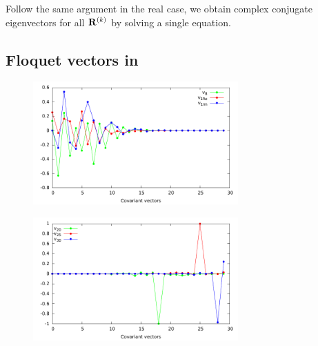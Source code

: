 \documentclass[mathserif, handout]{beamer}
\begin{document}
\begin{frame}[allowframebreaks]
\begin{itemize}
       Follow the same argument in the real case, we obtain complex conjugate
       eigenvectors for all $\mathbf{R}^{(k)}$ by solving a single equation.

  \end{itemize}

\end{frame}

\subsection{Floquet vectors in \KSe}

\begin{frame}
  \begin{figure}[h]
    \centering
    \includegraphics[width=0.7\textwidth, height=0.45\textheight]{ppo1ev_low}
  \end{figure}
  \begin{figure}[h]
    \centering
    \includegraphics[width=0.7\textwidth, height=0.45\textheight]{ppo1ev_high}
  \end{figure}
\end{frame}
\end{document}
